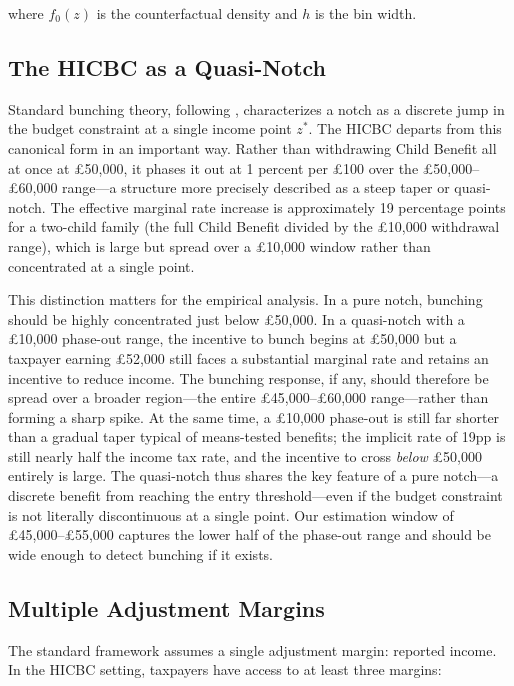 \documentclass[12pt]{article}
\begin{document}
\noindent where $f_0(z)$ is the counterfactual density and $h$ is the bin width.

\subsection{The HICBC as a Quasi-Notch}

Standard bunching theory, following \citet{kleven2013}, characterizes a notch as a discrete jump in the budget constraint at a single income point $z^*$. The HICBC departs from this canonical form in an important way. Rather than withdrawing Child Benefit all at once at \pounds50,000, it phases it out at 1 percent per \pounds100 over the \pounds50,000--\pounds60,000 range---a structure more precisely described as a steep taper or quasi-notch. The effective marginal rate increase is approximately 19 percentage points for a two-child family (the full Child Benefit divided by the \pounds10,000 withdrawal range), which is large but spread over a \pounds10,000 window rather than concentrated at a single point.

This distinction matters for the empirical analysis. In a pure notch, bunching should be highly concentrated just below \pounds50,000. In a quasi-notch with a \pounds10,000 phase-out range, the incentive to bunch begins at \pounds50,000 but a taxpayer earning \pounds52,000 still faces a substantial marginal rate and retains an incentive to reduce income. The bunching response, if any, should therefore be spread over a broader region---the entire \pounds45,000--\pounds60,000 range---rather than forming a sharp spike. At the same time, a \pounds10,000 phase-out is still far shorter than a gradual taper typical of means-tested benefits; the implicit rate of 19pp is still nearly half the income tax rate, and the incentive to cross \emph{below} \pounds50,000 entirely is large. The quasi-notch thus shares the key feature of a pure notch---a discrete benefit from reaching the entry threshold---even if the budget constraint is not literally discontinuous at a single point. Our estimation window of \pounds45,000--\pounds55,000 captures the lower half of the phase-out range and should be wide enough to detect bunching if it exists.

\subsection{Multiple Adjustment Margins}

The standard framework assumes a single adjustment margin: reported income. In the HICBC setting, taxpayers have access to at least three margins:
\end{document}
